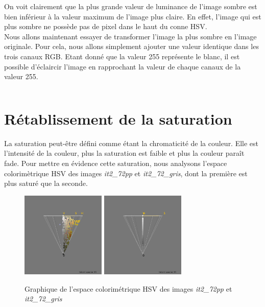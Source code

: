 \documentclass[a4paper,10pt]{article}
\begin{document}
On voit clairement que la plus grande valeur de luminance de l'image sombre est bien inférieur
à la valeur maximum de l'image plus claire. En effet, l'image qui est plus sombre ne possède pas de pixel dans le haut du conne
HSV.\\

Nous allons maintenant essayer de transformer l'image la plus sombre en l'image originale. Pour cela,
nous allons simplement ajouter une valeur identique dans les trois canaux RGB. Etant donné que la valeur 255
représente le blanc, il est possible d'éclaircir l'image en rapprochant la valeur de chaque canaux de la valeur 255.

\begin{tabular}{|c|c|c|}
 
\end{tabular}


\section{Rétablissement de la saturation}
La saturation peut-être défini comme étant la chromaticité de la couleur. Elle est l'intensité de la couleur, plus
la saturation est faible et plus la couleur paraît fade. Pour mettre en évidence cette saturation, nous analysons
l'espace colorimètrique HSV des images \textit{it2\_72pp} et \textit{it2\_72\_gris}, dont la première est plus saturé
que la seconde.\\

\begin{figure}[!h]
 \begin{center}
 \includegraphics[width=4cm]{resultat/saturation1.png}
 \includegraphics[width=4cm]{resultat/saturation2.png}
 \caption{Graphique de l'espace colorimétrique HSV des images \textit{it2\_72pp} et \textit{it2\_72\_gris}}
 \end{center}
\end{figure}
\end{document}
